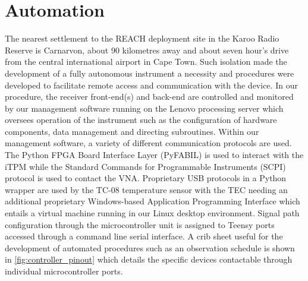 \section{Automation}
The nearest settlement to the REACH deployment site in the Karoo Radio Reserve is Carnarvon, about 90 kilometres away and about seven hour’s drive from the central international airport in Cape Town. Such isolation made the development of a fully autonomous instrument a necessity and procedures were developed to facilitate remote access and communication with the device. In our procedure, the receiver front-end(s) and back-end are controlled and monitored by our management software running on the Lenovo processing server which oversees operation of the instrument such as the configuration of hardware components, data management and directing subroutines. Within our management software, a variety of different communication protocols are used. The Python FPGA Board Interface Layer (PyFABIL) is used to interact with the iTPM while the Standard Commands for Programmable Instruments (SCPI) protocol is used to contact the VNA. Proprietary USB protocols in a Python wrapper are used by the TC-08 temperature sensor with the TEC needing an additional proprietary Windows-based Application Programming Interface which entails a virtual machine running in our Linux desktop environment. Signal path configuration through the microcontroller unit is assigned to Teensy ports accessed through a command line serial interface. A crib sheet useful for the development of automated procedures such as an observation schedule is shown in \cref{fig:controller_pinout} which details the specific devices contactable through individual microcontroller ports.
